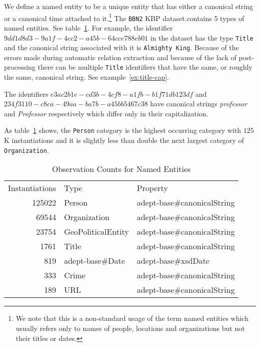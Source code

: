 \documentclass[paper=a4,fontsize=11pt]{scrartcl}
\newcommand{\tabref}[1]{table~\ref{#1}}
\newcommand{\exref}[1]{example~\ref{#1}}
\numberwithin{equation}{section}    %
\numberwithin{figure}{section}      %
\numberwithin{table}{section}       %
\newcommand{\dataset}[0]{\texttt{BBN2} KBP dataset.}
\begin{document}
We define a named entity to be a unique entity that has either a canonical string
or a canonical time attached to it.\footnote{
We note that this is a non-standard usage of the term named entities which usually refers only to
names of people, locations and organizations but not their titles or dates.}
The \dataset contains 5 types of named entities. See \tabref{tab:type}.
For example, the identifier $9dd1d8d3-9a1f-4ec2-a45b-64cce788eb01$ in the dataset has
the type \texttt{Title}
and the canonical string associated with it is \texttt{Almighty King}.
 Because of the errors made
during automatic relation extraction and because of the lack of post-processing there can be multiple
\texttt{Title} identifiers that have the same, or roughly the same, canonical string.
See \exref{ex:title-cap}.
\begin{example}
\label{ex:title-cap}
The identifiers $e3ac2b1e-cd3b-4cf8-a1fb-b1f71db123df$ and
$234f3110-c8ca-49aa-ba7b-a45bb5467c38$ have canonical strings \textit{professor} and
\textit{Professor} respectively which differ only in their capitalization.
\end{example}

As \tabref{tab:type} shows, the \texttt{Person} category is the highest occurring
category with $125$K instantiations
and it is slightly less than double the next largest category of \texttt{Organization}.

\begin{table}[htbp]
  \centering
  \begin{tabular}{r l l}
    Instantiations & Type                          & Property                   \\
    125022         & Person             & adept-base\#canonicalString \\
    69544          & Organization       & adept-base\#canonicalString \\
    23754          & GeoPoliticalEntity & adept-base\#canonicalString \\
    1761           & Title              & adept-base\#canonicalString \\
    819            & adept-base\#Date               & adept-base\#xsdDate         \\
    333            & Crime              & adept-base\#canonicalString \\
    189            & URL                & adept-base\#canonicalString \\
  \end{tabular}
  \caption{Observation Counts for Named Entities}
  \label{tab:type}
\end{table}
\end{document}

